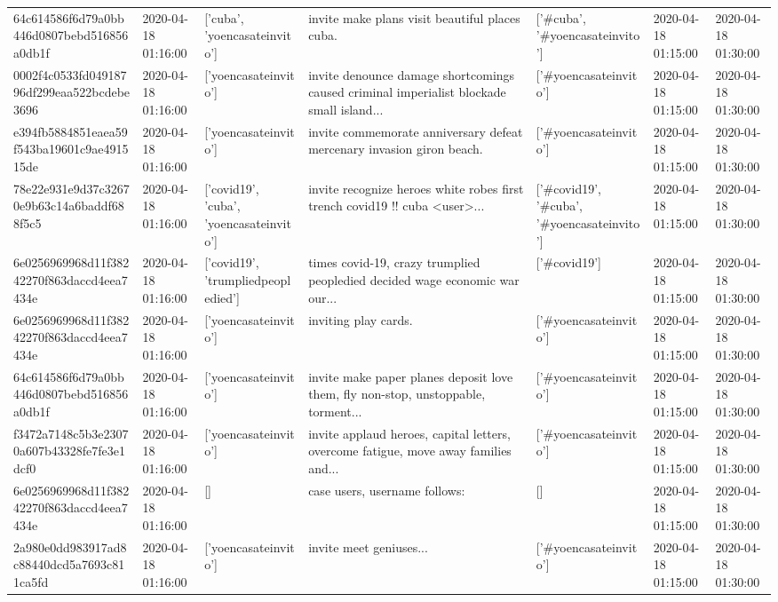 \begin{tabular}{lllllll}
64c614586f6d79a0bb446d0807bebd516856a0db1f & 2020-04-18 01:16:00 & ['cuba', 'yoencasateinvito'] & invite make plans visit beautiful places cuba. & ['#cuba', '#yoencasateinvito'] & 2020-04-18 01:15:00 & 2020-04-18 01:30:00 \\
0002f4c0533fd04918796df299eaa522bcdebe3696 & 2020-04-18 01:16:00 & ['yoencasateinvito'] & invite denounce damage shortcomings caused criminal imperialist blockade small island... & ['#yoencasateinvito'] & 2020-04-18 01:15:00 & 2020-04-18 01:30:00 \\
e394fb5884851eaea59f543ba19601c9ae491515de & 2020-04-18 01:16:00 & ['yoencasateinvito'] & invite commemorate anniversary defeat mercenary invasion giron beach. & ['#yoencasateinvito'] & 2020-04-18 01:15:00 & 2020-04-18 01:30:00 \\
78e22e931e9d37c32670e9b63c14a6baddf688f5c5 & 2020-04-18 01:16:00 & ['covid19', 'cuba', 'yoencasateinvito'] & invite recognize heroes white robes first trench covid19 !!️ cuba <user>... & ['#covid19', '#cuba', '#yoencasateinvito'] & 2020-04-18 01:15:00 & 2020-04-18 01:30:00 \\
6e0256969968d11f38242270f863daccd4eea7434e & 2020-04-18 01:16:00 & ['covid19', 'trumpliedpeopledied'] & times covid-19, crazy trumplied peopledied decided wage economic war our... & ['#covid19'] & 2020-04-18 01:15:00 & 2020-04-18 01:30:00 \\
6e0256969968d11f38242270f863daccd4eea7434e & 2020-04-18 01:16:00 & ['yoencasateinvito'] & inviting play cards. & ['#yoencasateinvito'] & 2020-04-18 01:15:00 & 2020-04-18 01:30:00 \\
64c614586f6d79a0bb446d0807bebd516856a0db1f & 2020-04-18 01:16:00 & ['yoencasateinvito'] & invite make paper planes deposit love them, fly non-stop, unstoppable, torment... & ['#yoencasateinvito'] & 2020-04-18 01:15:00 & 2020-04-18 01:30:00 \\
f3472a7148c5b3e23070a607b43328fe7fe3e1dcf0 & 2020-04-18 01:16:00 & ['yoencasateinvito'] & invite applaud heroes, capital letters, overcome fatigue, move away families and... & ['#yoencasateinvito'] & 2020-04-18 01:15:00 & 2020-04-18 01:30:00 \\
6e0256969968d11f38242270f863daccd4eea7434e & 2020-04-18 01:16:00 & [] & case users, username follows: & [] & 2020-04-18 01:15:00 & 2020-04-18 01:30:00 \\
2a980e0dd983917ad8c88440dcd5a7693c811ca5fd & 2020-04-18 01:16:00 & ['yoencasateinvito'] & invite meet geniuses... & ['#yoencasateinvito'] & 2020-04-18 01:15:00 & 2020-04-18 01:30:00 \\

\end{tabular}
